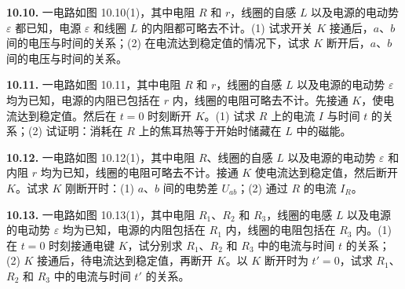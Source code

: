 \begin{center}
\end{center}

\vfill
\newpage

\textbf{10.10.} 一电路如图 10.10(1)，其中电阻 $R$ 和 $r$，线圈的自感 $L$ 以及电源的电动势 $\varepsilon$ 都已知，电源 $\varepsilon$ 和线圈 $L$ 的内阻都可略去不计。(1) 试求开关 $K$ 接通后，$a$、$b$ 间的电压与时间的关系；(2) 在电流达到稳定值的情况下，试求 $K$ 断开后，$a$、$b$ 间的电压与时间的关系。

\begin{center}
\end{center}

\vfill
\newpage

\textbf{10.11.} 一电路如图 10.11，其中电阻 $R$ 和 $r$，线圈的自感 $L$ 以及电源的电动势 $\varepsilon$ 均为已知，电源的内阻已包括在 $r$ 内，线圈的电阻可略去不计。先接通 $K$，使电流达到稳定值。然后在 $t = 0$ 时刻断开 $K$。(1) 试求 $R$ 上的电流 $I$ 与时间 $t$ 的关系；(2) 试证明：消耗在 $R$ 上的焦耳热等于开始时储藏在 $L$ 中的磁能。

\begin{center}
\end{center}

\vfill
\newpage

\textbf{10.12.} 一电路如图 10.12(1)，其中电阻 $R$、线圈的自感 $L$ 以及电源的电动势 $\varepsilon$ 和内阻 $r$ 均为已知，线圈的电阻可略去不计。接通 $K$ 使电流达到稳定值，然后断开 $K$。试求 $K$ 刚断开时：(1) $a$、$b$ 间的电势差 $U_{ab}$；(2) 通过 $R$ 的电流 $I_R$。

\begin{center}
\end{center}

\vfill
\newpage

\textbf{10.13.} 一电路如图 10.13(1)，其中电阻 $R_1$、$R_2$ 和 $R_3$，线圈的电感 $L$ 以及电源的电动势 $\varepsilon$ 均为已知，电源的内阻包括在 $R_1$ 内，线圈的电阻包括在 $R_3$ 内。(1) 在 $t = 0$ 时刻接通电键 $K$，试分别求 $R_1$、$R_2$ 和 $R_3$ 中的电流与时间 $t$ 的关系；(2) $K$ 接通后，待电流达到稳定值，再断开 $K$。以 $K$ 断开时为 $t' = 0$，试求 $R_1$、$R_2$ 和 $R_3$ 中的电流与时间 $t'$ 的关系。

\begin{center}
\end{center}


